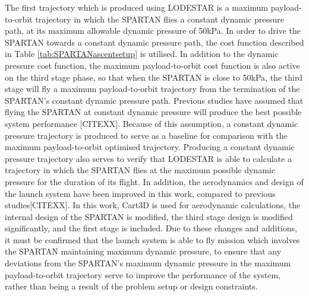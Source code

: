 The first trajectory which is produced using LODESTAR is a maximum payload-to-orbit trajectory in which the SPARTAN flies a constant dynamic pressure path, at its maximum allowable dynamic pressure of 50kPa. In order to drive the SPARTAN towards a constant dynamic pressure path, the cost function described in Table \ref{tab:SPARTANascentsetup} is utilised. In addition to the dynamic pressure cost function, the maximum payload-to-orbit cost function is also active on the third stage phase, so that when the SPARTAN is close to 50kPa, the third stage will fly a maximum payload-to-orbit trajectory from the termination of the SPARTAN's constant dynamic pressure path.
Previous studies have assumed that flying the SPARTAN at constant dynamic pressure will produce the best possible system performance [CITEXX]. Because of this assumption, a constant dynamic pressure trajectory is produced to serve as a baseline for comparison with the maximum payload-to-orbit optimised trajectory. Producing a constant dynamic pressure trajectory also serves to verify that LODESTAR is able to calculate a trajectory in which the SPARTAN flies at the maximum possible dynamic pressure for the duration of its flight. 
In addition, the aerodynamics and design of the launch system have been improved in this work, compared to previous studies[CITEXX]. In this work, Cart3D is used for aerodynamic calculations, the internal design of the SPARTAN is modified, the third stage design is modified significantly, and the first stage is included. Due to these changes and additions, it must be confirmed that the launch system is able to fly mission which involves the SPARTAN maintaining maximum dynamic pressure, to ensure that any deviations from the SPARTAN's maximum dynamic pressure in the maximum payload-to-orbit trajectory serve to improve the performance of the system, rather than being a result of the problem setup or design constraints. 

